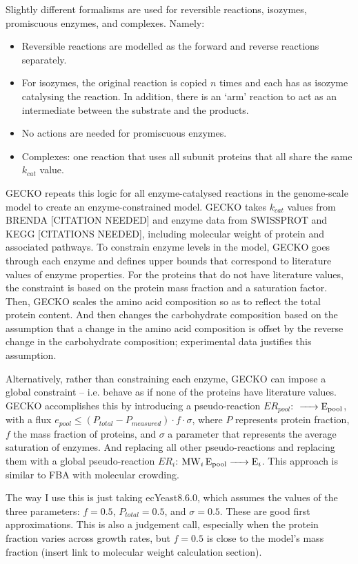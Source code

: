 Slightly different formalisms are used for reversible reactions, isozymes, promiscuous enzymes, and complexes.  Namely:
\begin{itemize}
  \item Reversible reactions are modelled as the forward and reverse reactions separately.
  \item For isozymes, the original reaction is copied $n$ times and each has as isozyme catalysing the reaction.
  In addition, there is an `arm' reaction to act as an intermediate between the substrate and the products.
  \item No actions are needed for promiscuous enzymes.
  \item Complexes: one reaction that uses all subunit proteins that all share the same $k_{cat}$ value.
\end{itemize}

GECKO repeats this logic for all enzyme-catalysed reactions in the genome-scale model to create an enzyme-constrained model.
GECKO takes $k_{cat}$ values from BRENDA [CITATION NEEDED] and enzyme data from SWISSPROT and KEGG [CITATIONS NEEDED], including molecular weight of protein and associated pathways.
To constrain enzyme levels in the model, GECKO goes through each enzyme and defines upper bounds that correspond to literature values of enzyme properties.
For the proteins that do not have literature values, the constraint is based on the protein mass fraction and a saturation factor.
Then, GECKO scales the amino acid composition so as to reflect the total protein content.
And then changes the carbohydrate composition based on the assumption that a change in the amino acid composition is offset by the reverse change in the carbohydrate composition;
experimental data justifies this assumption.

Alternatively, rather than constraining each enzyme, GECKO can impose a global constraint -- i.e. behave as if none of the proteins have literature values.
GECKO accomplishes this by introducing a pseudo-reaction $ER_{pool}$: $\ce{ -> E_{pool} }$, with a flux $e_{pool} \le (P_{total} - P_{measured}) \cdot f \cdot \sigma$, where $P$ represents protein fraction, $f$ the mass fraction of proteins, and $\sigma$ a parameter that represents the average saturation of enzymes.
And replacing all other pseudo-reactions and replacing them with a global pseudo-reaction $ER_{i}$: $\ce{ MW_{i} E_{pool} -> E_{i} }$.
This approach is similar to FBA with molecular crowding.

The way I use this is just taking ecYeast8.6.0, which assumes the values of the three parameters: $f = 0.5$, $P_{total} = 0.5$, and $\sigma = 0.5$.
These are good first approximations.
This is also a judgement call, especially when the protein fraction varies across growth rates, but $f = 0.5$ is close to the model's mass fraction (insert link to molecular weight calculation section).


